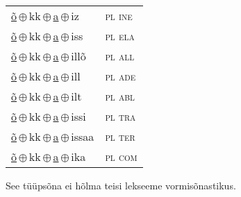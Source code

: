 \begin{minipage}{\textwidth}
\begin{sideways}
\begin{tabular}{l l}
\underline{õ}\,$\oplus$\,kk\,$\oplus$\,\underline{a}\,$\oplus$\,iz & \textsc{ pl ine } \\
\underline{õ}\,$\oplus$\,kk\,$\oplus$\,\underline{a}\,$\oplus$\,iss & \textsc{ pl ela } \\
\underline{õ}\,$\oplus$\,kk\,$\oplus$\,\underline{a}\,$\oplus$\,illõ & \textsc{ pl all } \\
\underline{õ}\,$\oplus$\,kk\,$\oplus$\,\underline{a}\,$\oplus$\,ill & \textsc{ pl ade } \\
\underline{õ}\,$\oplus$\,kk\,$\oplus$\,\underline{a}\,$\oplus$\,ilt & \textsc{ pl abl } \\
\underline{õ}\,$\oplus$\,kk\,$\oplus$\,\underline{a}\,$\oplus$\,issi & \textsc{ pl tra } \\
\underline{õ}\,$\oplus$\,kk\,$\oplus$\,\underline{a}\,$\oplus$\,issaa & \textsc{ pl ter } \\
\underline{õ}\,$\oplus$\,kk\,$\oplus$\,\underline{a}\,$\oplus$\,ika & \textsc{ pl com } \\
\end{tabular}
\end{sideways}
\label{tab:tüüpsõnamall-õgaz}

\end{minipage}

 
\vspace{1em}
\noindent See tüüpsõna ei hõlma teisi lekseeme vormi\-sõnastikus.
